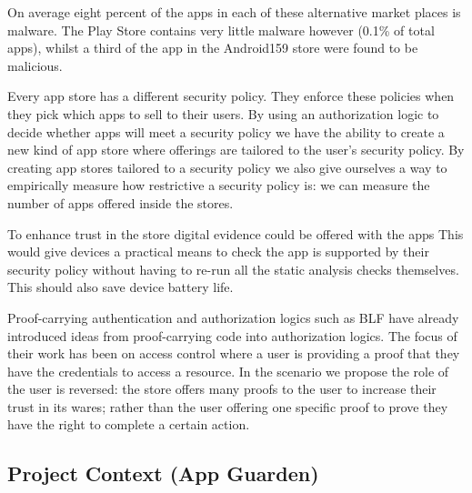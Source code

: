 \documentclass[a4paper,sfsidenotes]{tufte-book}
\begin{document}
On average eight percent\cite{AQUILINO:2013wr} of the apps in each of these
alternative market places is malware. The Play Store contains very little
malware however (0.1\% of total apps), whilst a third of the app in the
Android159 store were found to be malicious.

Every app store has a different security policy.  They enforce these
policies when they pick which apps to sell to their users.  By using an
authorization logic to decide whether apps will meet a security policy we have
the ability to create a new kind of app store where offerings are tailored to
the user's security policy.  By creating app stores tailored to a security
policy we also give ourselves a way to empirically measure how restrictive a
security policy is: we can measure the number of apps offered inside the stores.

To enhance trust in the store digital evidence could be offered
with the apps This would give devices a practical means to check the app is
supported by their security policy without having to re-run all the static
analysis checks
themselves. This should also save device battery life.  

Proof-carrying authentication\cite{Appel:1999dq} and authorization logics such
as BLF\cite{Whitehead:2004bu} have already introduced ideas from proof-carrying
code into authorization logics. The focus of their work has been on
access control where a user is providing a proof that they have the credentials
to access a resource.   In the scenario we propose the role of the user is
reversed: the store offers many proofs to the user to increase their trust in
its wares; rather than the user offering one specific proof to prove they have
the right to complete a certain action.


\subsection{Project Context (App Guarden)}
\end{document}
